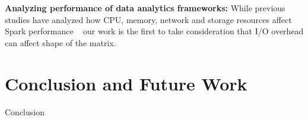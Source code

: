 \documentclass[10pt, conference, compsocconf]{IEEEtran}
\begin{document}
\textbf{Analyzing performance of data analytics frameworks:} While previous studies have analyzed how CPU, memory, network and storage resources affect Spark performance ~\cite{196352,li2014tachyon,ousterhout2015making} our work is the first to take consideration that I/O overhead can affect shape of the matrix. 


\section{Conclusion and Future Work}
Conclusion~\cite{tr-spark}




\end{document}

